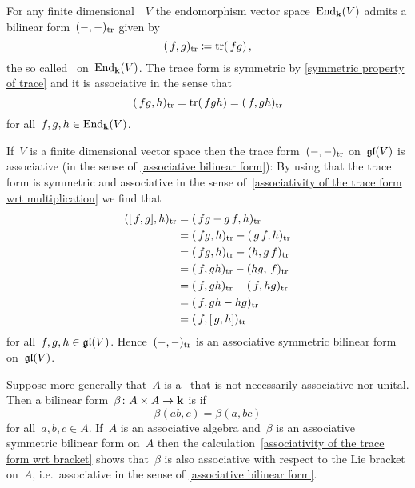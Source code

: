 \begin{recall}
  \label{recalling the trace form}
  For any finite dimensional~{\vectorspace{$\kf$}}~$V$ the endomorphism vector space~$\operatorname{End}_{\mathbf{k}}(V)$ admits a bilinear form~$(-,-)_{\operatorname{tr}}$ given by
  \[
    (\, f, g)_{\operatorname{tr}}
    \coloneqq
    \operatorname{tr}(\, f {} g) \,,
  \]
  the so called~ on~$\operatorname{End}_{\mathbf{k}}(V)$.
  The trace form is symmetric by \cref{symmetric property of trace} and it is associative in the sense that
  \begin{equation}
    \label{associativity of the trace form wrt multiplication}
    (\, f {} g, h)_{\operatorname{tr}}
    =
    \operatorname{tr}(\, f {} g h)
    =
    (\, f, gh)_{\operatorname{tr}}
  \end{equation}
  for all~$f, g, h \in \operatorname{End}_{\mathbf{k}}(V)$.
\end{recall}


\begin{example}
  \label{trace form is symmetric and associative}
  If~$V$ is a finite dimensional vector space then the trace form~$(-,-)_{\operatorname{tr}}$ on~$\mathfrak{gl}(V)$ is associative (in the sense of \cref{associative bilinear form}):
  By using that the trace form is symmetric and associative in the sense of~\eqref{associativity of the trace form wrt multiplication} we find that
  \begin{equation}
    \label{associativity of the trace form wrt bracket}
    \begin{aligned}
      ([\, f,g],h)_{\operatorname{tr}}
      &=
      (\, f {} g - g \, f, h)_{\operatorname{tr}}
      \\
      &=
      (\, f {} g, h)_{\operatorname{tr}} - (\, g \, f,h)_{\operatorname{tr}}
      \\
      &=
      (\, f {} g, h)_{\operatorname{tr}} - (h, g \, f)_{\operatorname{tr}}
      \\
      &=
      (\, f, gh)_{\operatorname{tr}} - (hg, \, f)_{\operatorname{tr}}
      \\
      &=
      (\, f, gh)_{\operatorname{tr}} - (\, f, hg)_{\operatorname{tr}}
      \\
      &=
      (\, f, gh - hg)_{\operatorname{tr}}
      \\
      &=
      (\, f, [\, g,h])_{\operatorname{tr}}
    \end{aligned}
  \end{equation}
  for all~$f, g, h \in \mathfrak{gl}(V)$.
  Hence~$(-,-)_{\operatorname{tr}}$ is an associative symmetric bilinear form on~$\mathfrak{gl}(V)$.
\end{example}


\begin{remark}
  Suppose more generally that~$A$ is a~{\algebra{$\kf$}} that is not necessarily associative nor unital.
  Then a bilinear form~$\beta \colon A \times A \to \mathbf{k}$ is  if
  \[
    \beta(ab, c)
    =
    \beta(a, bc)
  \]
  for all~$a, b , c \in A$.
  If~$A$ is an associative algebra and~$\beta$ is an associative symmetric bilinear form on~$A$ then the calculation~\eqref{associativity of the trace form wrt bracket} shows that~$\beta$ is also associative with respect to the Lie bracket on~$A$, i.e.\ associative in the sense of \cref{associative bilinear form}.
\end{remark}


